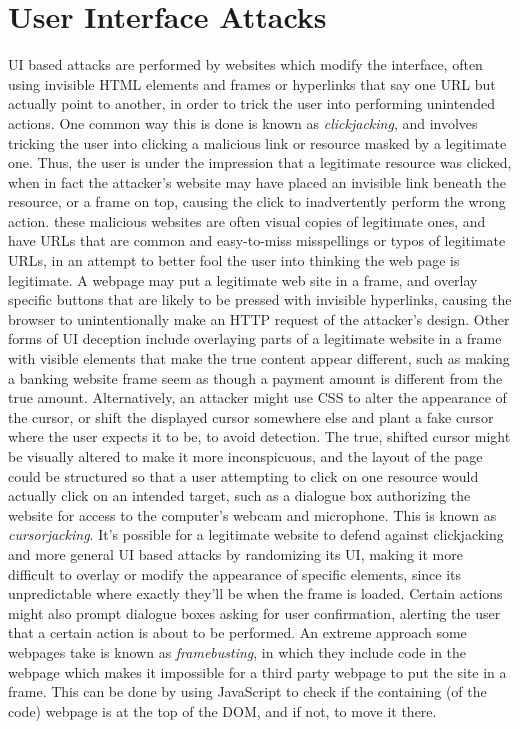 \documentclass{article}
\begin{document}
\section{User Interface Attacks}
UI based attacks are performed by websites which modify the interface, often using invisible HTML elements and frames or hyperlinks that say one URL but actually point to another, in order to trick the user into performing unintended actions. One common way this is done is known as \textit{clickjacking}, and involves tricking the user into clicking a malicious link or resource masked by a legitimate one. Thus, the user is under the impression that a legitimate resource was clicked, when in fact the attacker's website may have placed an invisible link beneath the resource, or a frame on top, causing the click to inadvertently perform the wrong action. these malicious websites are often visual copies of legitimate ones, and have URLs that are common and easy-to-miss misspellings or typos of legitimate URLs, in an attempt to better fool the user into thinking the web page is legitimate. A webpage may put a legitimate web site in a frame, and overlay specific buttons that are likely to be pressed with invisible hyperlinks, causing the browser to unintentionally make an HTTP request of the attacker's design.
\newline
Other forms of UI deception include overlaying parts of a legitimate website in a frame with visible elements that make the true content appear different, such as making a banking website frame seem as though a payment amount is different from the true amount. Alternatively, an attacker might use CSS to alter the appearance of the cursor, or shift the displayed cursor somewhere else and plant a fake cursor where the user expects it to be, to avoid detection. The true, shifted cursor might be visually altered to make it more inconspicuous, and the layout of the page could be structured so that a user attempting to click on one resource would actually click on an intended target, such as a dialogue box authorizing the website for access to the computer's webcam and microphone. This is known as \textit{cursorjacking}.
\newline \newline
It's possible for a legitimate website to defend against clickjacking and more general UI based attacks by randomizing its UI, making it more difficult to overlay or modify the appearance of specific elements, since its unpredictable where exactly they'll be when the frame is loaded. Certain actions might also prompt dialogue boxes asking for user confirmation, alerting the user that a certain action is about to be performed. An extreme approach some webpages take is known as \textit{framebusting}, in which they include code in the webpage which makes it impossible for a third party webpage to put the site in a frame. This can be done by using JavaScript to check if the containing (of the code) webpage is at the top of the DOM, and if not, to move it there.
\end{document}
